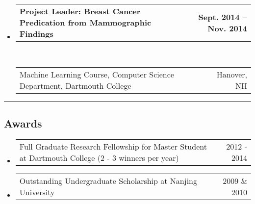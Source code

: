 \documentclass[10pt,letterpaper]{article}
\makeatletter
\newcommand{\headerrow}[2]
{\begin{tabular*}{\linewidth}{l@{\extracolsep{\fill}}r}
	#1 &
	#2 \\
\end{tabular*}}
\makeatother
\begin{document}
\begin{itemize}
    \item
    \headerrow
		{\textbf{Project Leader: Breast Cancer Predication from Mammographic Findings}}
		{\textbf{Sept. 2014 -- Nov. 2014}}
	\\
    \headerrow
		{Machine Learning Course, Computer Science Department, Dartmouth College}
		{Hanover, NH}

%
\end{itemize}


\hrule


\subsection*{Awards}

\begin{itemize}
	\parskip=0.1em
    \item
    \headerrow
    {Full Graduate Research Fellowship for Master Student at Dartmouth College (2 - 3 winners per year)}
    {2012 - 2014}

    \item
    \headerrow
    {Outstanding Undergraduate Scholarship at Nanjing University}
    {2009 \& 2010}

\end{itemize}
\end{document}
